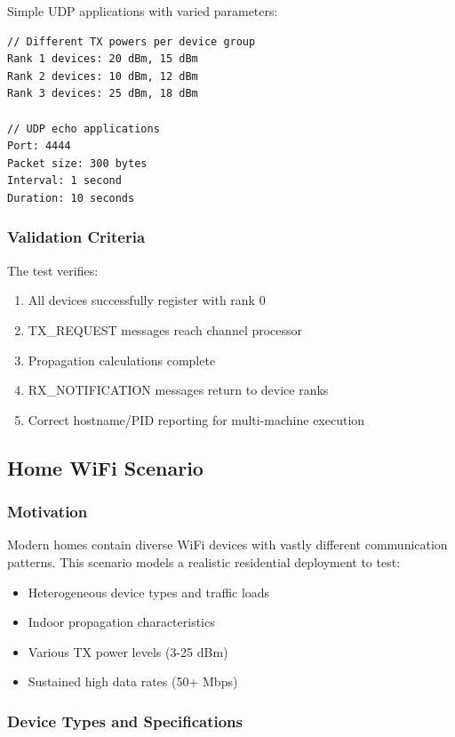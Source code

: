Simple UDP applications with varied parameters:
\begin{lstlisting}[style=cpp, caption={Integration test traffic configuration}]
// Different TX powers per device group
Rank 1 devices: 20 dBm, 15 dBm
Rank 2 devices: 10 dBm, 12 dBm  
Rank 3 devices: 25 dBm, 18 dBm

// UDP echo applications
Port: 4444
Packet size: 300 bytes
Interval: 1 second
Duration: 10 seconds
\end{lstlisting}

\subsubsection{Validation Criteria}

The test verifies:
\begin{enumerate}
    \item All devices successfully register with rank 0
    \item TX\_REQUEST messages reach channel processor
    \item Propagation calculations complete
    \item RX\_NOTIFICATION messages return to device ranks
    \item Correct hostname/PID reporting for multi-machine execution
\end{enumerate}

\subsection{Home WiFi Scenario}

\subsubsection{Motivation}

Modern homes contain diverse WiFi devices with vastly different communication patterns. This scenario models a realistic residential deployment to test:
\begin{itemize}
    \item Heterogeneous device types and traffic loads
    \item Indoor propagation characteristics
    \item Various TX power levels (3-25 dBm)
    \item Sustained high data rates (50+ Mbps)
\end{itemize}

\subsubsection{Device Types and Specifications}

